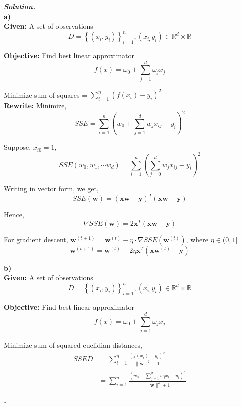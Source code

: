 \documentclass[8pt]{article}
\newenvironment{solution}[1][\it{Solution}]{\textbf{#1. } }{$\square$}
\begin{document}
\begin{solution}\\

\textbf{a)}\\

\textbf{Given:} A set of observations
$$
D=\left\{\left(x_{i}, y_{i}\right)\right\}_{i=1}^{n},\left(x_{i,} y_{i}\right) \in \mathbb{R}^{d} \times \mathbb{R}
$$

\textbf{Objective:} Find best linear approximator
$$
f(x)=\omega_{0}+\sum_{j=1}^{d} \omega_{j} x_{j}
$$

Minimize sum of squares = $\sum_{i=1}^{n}\left(f\left(x_{i}\right)-y_{i}\right)^{2}$\\

\textbf{Rewrite:} Minimize,
$$
SSE=\sum_{i=1}^{n}\left(w_{0}+\sum_{j=1}^{d} w_{j} x_{i j}-y_{i}\right)^{2}
$$

Suppose, $\boxed{x_{i 0}=1}$,
$$
SSE\left(w_{0}, w_{1}, \cdots w_{d}\right)=\sum_{i=1}^{n}\left(\sum_{j=0}^{d} w_{j} x_{i j}-y_{i}\right)^{2}
$$

Writing in vector form, we get,
$$
\boxed{SSE(\mathbf{w}) = \left(\mathbf{xw}-\mathbf{y}\right)^T\left(\mathbf{xw}-\mathbf{y}\right)}
$$

Hence,
$$
\boxed{\nabla SSE(\mathbf{w})=2\mathbf{x}^{T}\left(\mathbf{xw}-\mathbf{y}\right)}
$$

For gradient descent,
$
\mathbf{w}^{(t+1)}=\mathbf{w}^{(t)}-\eta \cdot \nabla SSE\left(\mathbf{w}^{(t)}\right)
$, where $\eta \in(0,1]$ \\

$$
\boxed{\mathbf{w}^{(t+1)}=\mathbf{w}^{(t)}-2 \eta \mathbf{x}^{T}\left(\mathbf{xw}^{(t)}-\mathbf{y}\right)}
$$


\textbf{b)}\\

\textbf{Given:} A set of observations
$$
D=\left\{\left(x_{i}, y_{i}\right)\right\}_{i=1}^{n},\left(x_{i,} y_{i}\right) \in \mathbb{R}^{d} \times \mathbb{R}
$$

\textbf{Objective:} Find best linear approximator
$$
f(x)=\omega_{0}+\sum_{j=1}^{d} \omega_{j} x_{j}
$$


Minimize sum of squared euclidian distances,
$$
\begin{aligned}
SSED &=\sum_{i=1}^{n}\frac{(f\left(x_{i}\right)-y_{i})^2}{\|\mathbf{w}\|^2+1} \\
&= \sum_{i=1}^{n} \frac{\left(w_{0}+\sum_{j=1}^{d} w_{j} x_{i}-y_{i}\right)^{2}}{\|\mathbf{w}\|^{2}+1}
\end{aligned}
$$


\end{solution}
\end{document}

